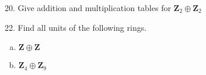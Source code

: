 \begin{mdframed}[style=darkQuesion]
  20. Give addition and multiplication tables for $\mathbf{Z}_{2} \oplus \mathbf{Z}_{2}$
\end{mdframed}
\begin{mdframed}[style=darkAnswer,frametitle={Joe Starr}]
\end{mdframed}
\newpage
\begin{mdframed}[style=darkQuesion]
  22. Find all units of the following rings.
   \begin{enumerate}[(a)]
  \item{$\mathbf{Z} \oplus \mathbf{Z}$}
  \item{$\mathbf{Z}_{4} \oplus \mathbf{Z}_{9}$}
  \end{enumerate} 
  
\end{mdframed}
\begin{mdframed}[style=darkAnswer,frametitle={Joe Starr}]
\end{mdframed}
\newpage